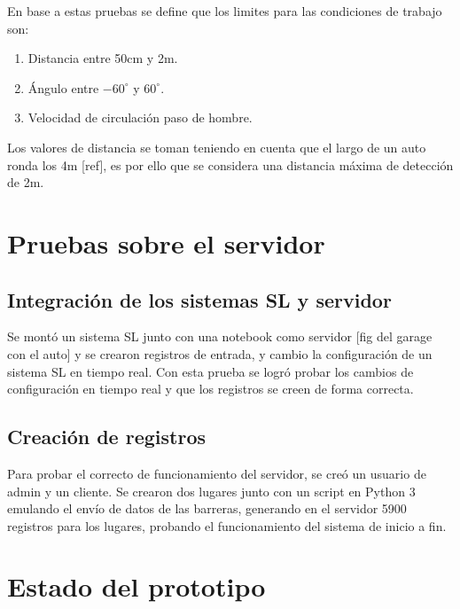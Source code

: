En base a estas pruebas se define que los limites para las condiciones de trabajo son:
\begin{enumerate}
    \item Distancia entre 50cm y 2m.
    \item Ángulo entre $-60^\circ$ y $60^\circ$.
    \item Velocidad de circulación paso de hombre.
\end{enumerate}
Los valores de distancia se toman teniendo en cuenta que el largo de un auto ronda los 4m [ref], es por ello que se considera una distancia máxima de detección de 2m.
\section{Pruebas sobre el servidor}

\subsection{Integración de los sistemas SL y servidor}

Se montó un sistema SL junto con una notebook como servidor [fig del garage con el auto] y se crearon registros de entrada, y cambio la configuración de un sistema SL en tiempo real. Con esta prueba se logró probar los cambios de configuración en tiempo real y que los registros se creen de forma correcta.

\subsection{Creación de registros}

Para probar el correcto de funcionamiento del servidor, se creó un usuario de admin y un cliente. Se crearon dos lugares junto con un script en Python 3 emulando el envío de datos de las barreras, generando en el servidor 5900 registros para los lugares, probando el funcionamiento del sistema de inicio a fin.

\section{Estado del prototipo}



